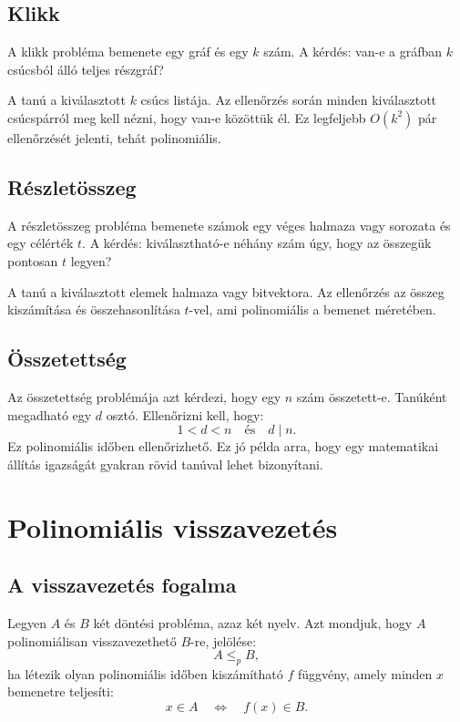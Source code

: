 \subsection{Klikk}

A klikk probléma bemenete egy gráf és egy $k$ szám. A kérdés: van-e a gráfban $k$ csúcsból álló teljes részgráf?

A tanú a kiválasztott $k$ csúcs listája. Az ellenőrzés során minden kiválasztott csúcspárról meg kell nézni, hogy van-e közöttük él. Ez legfeljebb $O(k^2)$ pár ellenőrzését jelenti, tehát polinomiális.

\subsection{Részletösszeg}

A részletösszeg probléma bemenete számok egy véges halmaza vagy sorozata és egy célérték $t$. A kérdés: kiválasztható-e néhány szám úgy, hogy az összegük pontosan $t$ legyen?

A tanú a kiválasztott elemek halmaza vagy bitvektora. Az ellenőrzés az összeg kiszámítása és összehasonlítása $t$-vel, ami polinomiális a bemenet méretében.

\subsection{Összetettség}

Az összetettség problémája azt kérdezi, hogy egy $n$ szám összetett-e. Tanúként megadható egy $d$ osztó. Ellenőrizni kell, hogy:
\[
  1<d<n
  \quad\text{és}\quad
  d\mid n.
\]
Ez polinomiális időben ellenőrizhető. Ez jó példa arra, hogy egy matematikai állítás igazságát gyakran rövid tanúval lehet bizonyítani.

\section{Polinomiális visszavezetés}

\subsection{A visszavezetés fogalma}

Legyen $A$ és $B$ két döntési probléma, azaz két nyelv. Azt mondjuk, hogy $A$ polinomiálisan visszavezethető $B$-re, jelölése:
\[
  A\leq_p B,
\]
ha létezik olyan polinomiális időben kiszámítható $f$ függvény, amely minden $x$ bemenetre teljesíti:
\[
  x\in A
  \quad\Longleftrightarrow\quad
  f(x)\in B.
\]


